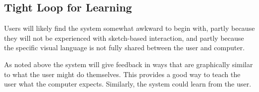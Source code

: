 \documentclass[12pt]{article}
\begin{document}
\subsection{Tight Loop for Learning}

Users will likely find the system somewhat awkward to begin with,
partly because they will not be experienced with sketch-based
interaction, and partly because the specific visual language is not
fully shared between the user and computer.

As noted above the system will give feedback in ways that are
graphically similar to what the user might do themselves. This
provides a good way to teach the user what the computer
expects. Similarly, the system could learn from the user.
\end{document}
